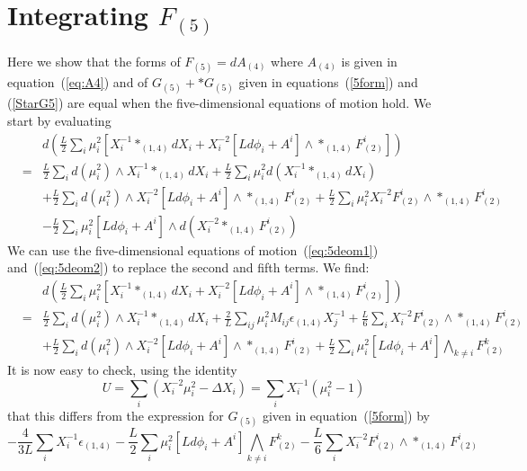\documentclass[a4paper,12pt]{article}
\begin{document}
\section{Integrating $F_{(5)}$}
\label{IntF5}
Here we show that the forms of $F_{(5)} = dA_{(4)}$ where $A_{(4)}$ is given
in equation~(\ref{eq:A4}) and
of $G_{(5)} + *G_{(5)}$ given in equations~(\ref{5form}) and (\ref{StarG5}) are
equal when the five-dimensional equations of motion hold. We start by
evaluating
\begin{eqnarray}
  & & d \left( \frac{L}{2} \sum_i \mu_i^2 \left[ X_i^{-1} *_{(1,4)} d X_i +
	X_i^{-2} [Ld\phi_i + A^i] \wedge  *_{(1,4)} F^i_{(2)} \right] \right) \nonumber \\
&=&   \frac{L}{2} \sum_i d (\mu_i^2) \wedge X_i^{-1} *_{(1,4)} d X_i  + \frac{L}{2} \sum_i  \mu_i^2 d( X_i^{-1} *_{(1,4)} d X_i) \nonumber \\
& & + \frac{L}{2} \sum_i d (\mu_i^2) \wedge  X_i^{-2} [Ld\phi_i + A^i] \wedge  *_{(1,4)} F^i_{(2)} + \frac{L}{2} \sum_i \mu_i^2 X_i^{-2} F^i_{(2)} \wedge  *_{(1,4)} F^i_{(2)} \nonumber \\
& & -\frac{L}{2} \sum_i \mu_i^2 [Ld\phi_i + A^i] \wedge d(X_i^{-2} *_{(1,4)} F^i_{(2)} ) 
\end{eqnarray}
We can use the five-dimensional equations of motion~(\ref{eq:5deom1}) and~(\ref{eq:5deom2}) to replace the second and fifth terms. We find:
\begin{eqnarray}
   & & d \left(  \frac{L}{2} \sum_i \mu_i^2 \left[ X_i^{-1} *_{(1,4)} d X_i + X_i^{-2} [Ld\phi_i + A^i] \wedge *_{(1,4)} F^i_{(2)} \right] \right) \nonumber \\
&=&   \frac{L}{2} \sum_i d (\mu_i^2) \wedge X_i^{-1} *_{(1,4)} d X_i  + \frac{2}{L} \sum_{i j} \mu_i^2 M_{i j} \epsilon_{(1,4)} X_j^{-1} + \frac{L}{6} \sum_i X_i^{-2} F^i_{(2)} \wedge *_{(1,4)} F^i_{(2)} \nonumber \\
& & + \frac{L}{2} \sum_{i} d (\mu_i^2) \wedge  X_i^{-2} [Ld\phi_i + A^i] \wedge  *_{(1,4)} F^i_{(2)}  + \frac{L}{2} \sum_i \mu_i^2 [L d\phi_i + A^i] \bigwedge_{k \neq i} F^k_{(2)}
\end{eqnarray}
It is now easy to check, using the identity
$$ U = \sum_i(X_i^{-2}\mu_i^2 - \Delta X_i) = \sum_iX_i^{-1}(\mu_i^2 - 1) $$
that this differs from the expression for $G_{(5)}$ given in
equation~(\ref{5form}) by
$$ - \frac{4}{3L} \sum_i X_i^{-1} \epsilon_{(1,4)} -
    \frac{L}{2}\sum_i\mu_i^2[Ld\phi_i + A^i] \bigwedge_{k \ne i} F^k_{(2)}
 - \frac{L}{6} \sum_i X_i^{-2} F^i_{(2)} \wedge *_{(1,4)} F^i_{(2)} $$
\end{document}
